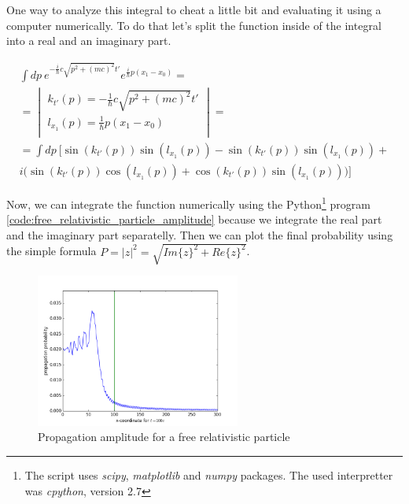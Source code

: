One way to analyze this integral to cheat a little bit and evaluating it using a computer numerically. To do that let's split 
the function inside of the integral into a real and an imaginary part.

\begin{equation*}
    \begin{gathered}
        \int dp \ e^{- \frac{i}{\hbar} c \sqrt{p^{2} + (mc)^{2}} t'} e^{\frac{i}{\hbar}p (x_{1} - x_{0})} =  \\
        = \begin{vmatrix}
            k_{t'}(p) = - \frac{1}{\hbar} c \sqrt{p^{2} + (mc)^{2}} t' \\
            l_{x_{1}}(p) = \frac{1}{\hbar}p (x_{1} - x_{0}) \\
        \end{vmatrix} = \\
        = \int dp \ \bigg[ \sin(k_{t'}(p)) \sin(l_{x_{1}}(p)) - \sin(k_{t'}(p)) \sin(l_{x_{1}}(p)) + \\ i\big(\sin(k_{t'}(p)) \cos(l_{x_{1}}(p)) + \cos(k_{t'}(p)) \sin(l_{x_{1}}(p))\big) \bigg]
    \end{gathered}
\end{equation*}

Now, we can integrate the function numerically using the Python\footnote{The script uses \textit{scipy}, \textit{matplotlib} and \textit{numpy} packages. 
The used interpretter was \textit{cpython}, version 2.7} program \ref{code:free_relativistic_particle_amplitude}  because we integrate the 
real part and the imaginary part separatelly. Then we can plot the final probability using the simple formula $P = |z|^{2} = \sqrt{Im\{z\}^{2} + Re\{z\}^{2}}$.

\begin{figure}[h]
    \centering
    \includegraphics[width=0.6\textwidth]{free_relativistic_particle.png}
    \caption{Propagation amplitude for a free relativistic particle}
    \label{fig:free_relativistic_particle_probability}
\end{figure}

